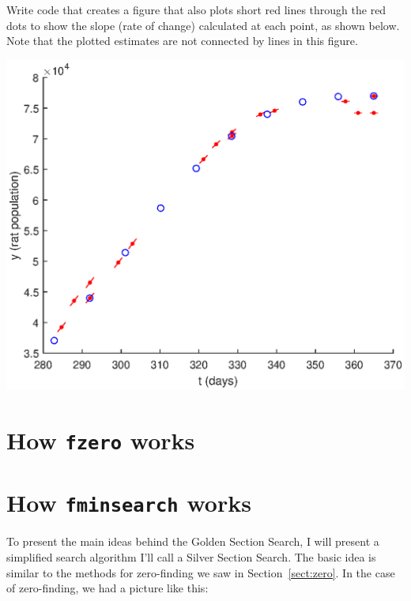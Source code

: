 \documentclass[
]{book}
\numberwithin{Answer}{chapter}
\numberwithin{Exercise}{chapter}
\begin{document}
\begin{ex}
Write code that creates a figure that also plots short 
red lines through the red dots to show the slope (rate of change) calculated
at each point, as shown below.  Note that the plotted estimates are not connected by lines in this figure.


\beforefig \centerline{\includegraphics[width=6.0in]{figs/ode45.eps}}
\end{ex}


\section{How {\tt fzero} works}

\section{How {\tt fminsearch} works}

To present the main ideas behind
the Golden Section Search, I will present a simplified
search algorithm I'll call a Silver Section Search.  The basic idea is similar to
the methods for zero-finding we saw in Section~\ref{sect:zero}.  In the
case of zero-finding, we had a picture like this:
\end{document}
